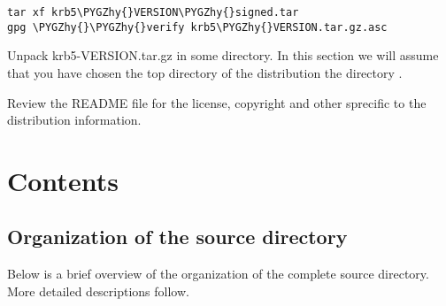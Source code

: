 \documentclass[letterpaper,10pt,english]{sphinxmanual}
\def\PYGZhy{\char`\-}
\begin{document}
\begin{Verbatim}[commandchars=\\\{\}]
tar xf krb5\PYGZhy{}VERSION\PYGZhy{}signed.tar
gpg \PYGZhy{}\PYGZhy{}verify krb5\PYGZhy{}VERSION.tar.gz.asc
\end{Verbatim}

Unpack krb5-VERSION.tar.gz in some directory. In this section we will assume
that you have chosen the top directory of the distribution the directory
.

Review the README file for the license, copyright and other sprecific to the
distribution information.


\chapter{Contents}
\label{build/index:contents}

\section{Organization of the source directory}
\label{build/directory_org::doc}\label{build/directory_org:organization-of-the-source-directory}
Below is a brief overview of the organization of the complete source
directory.  More detailed descriptions follow.
\end{document}
